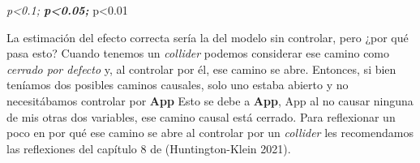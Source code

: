 \documentclass[
  letterpaper,
  DIV=11,
  numbers=noendperiod,
  oneside]{scrreprt}
\begin{document}
\begin{table}
\begin{minipage}[t]{\linewidth}
{\emph{p\textless0.1; \textbf{p\textless0.05; }}p\textless0.01

}

\end{minipage}%
\newline
\begin{minipage}[t]{\linewidth}

{\centering 

}

\end{minipage}%
\newline
\begin{minipage}[t]{\linewidth}

{\centering 

}

\end{minipage}%
\newline
\begin{minipage}[t]{\linewidth}

{\centering 

}

\end{minipage}%

\end{table}

La estimación del efecto correcta sería la del modelo sin controlar,
pero ¿por qué pasa esto? Cuando tenemos un \emph{collider} podemos
considerar ese camino como \emph{cerrado por defecto} y, al controlar
por él, ese camino se abre. Entonces, si bien teníamos dos posibles
caminos causales, solo uno estaba abierto y no necesitábamos controlar
por \textbf{App} Esto se debe a \textbf{App}, App al no causar ninguna
de mis otras dos variables, ese camino causal está cerrado. Para
reflexionar un poco en por qué ese camino se abre al controlar por un
\emph{collider} les recomendamos las reflexiones del capítulo 8 de
(Huntington-Klein
2021).
\end{document}
